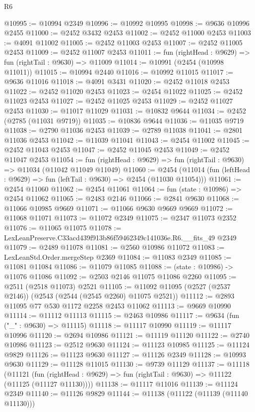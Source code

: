 \begin{lexlean}{R6}
\begin{coremodule}
@10995 := @10994 @2349
@10996 := @10992 @10995
@10998 := @9636 @10996 @2455
@11000 := @2452 @3432 @2453
@11002 := @2452 @11000 @2453
@11003 := @4091 @11002
@11005 := @2452 @11003 @2453
@11007 := @2452 @11005 @2453
@11009 := @2452 @11007 @2453
@11011 := fun (rightHead : @9629) => fun (rightTail : @9630) => @11009
@11014 := @10991 (@2454 (@10998 @11011))
@11015 := @10994 @2440
@11016 := @10992 @11015
@11017 := @9636 @11016
@11018 := @4091 @3431
@11020 := @2452 @11018 @2453
@11022 := @2452 @11020 @2453
@11023 := @2454 @11022
@11025 := @2452 @11023 @2453
@11027 := @2452 @11025 @2453
@11029 := @2452 @11027 @2453
@11030 := @11017 @11029
@11031 := @10832 @9644
@11034 := @2452 (@2785 (@11031 @9719))
@11035 := @10836 @9644
@11036 := @11035 @9719
@11038 := @2790 @11036 @2453
@11039 := @2789 @11038
@11041 := @2801 @11036 @2453
@11042 := @11039 @11041
@11043 := @2454 @11002
@11045 := @2452 @11043 @2453
@11047 := @2452 @11045 @2453
@11049 := @2452 @11047 @2453
@11054 := fun (rightHead : @9629) => fun (rightTail : @9630) => @11034 (@11042 @11049 @11049)
@11060 := @2454 (@11014 (fun (leftHead : @9629) => fun (leftTail : @9630) => @2454 (@11030 @11054)))
@11061 := @2454 @11060
@11062 := @2454 @11061
@11064 := fun (state : @10986) => @2454 @11062
@11065 := @2483 @2146
@11066 := @2841 @9630
@11068 := @11066 @10985 @9669
@11071 := @11066 @9630 @9669 @9669
@11072 := @11068 @11071
@11073 := @11072 @2349
@11075 := @2347 @11073 @2352
@11076 := @11065 @11075
@11078 := LexLeanPreserve.C33acd439f913b86f59462349c141036e.R6.__fits_49 @2349
@11079 := @2489 @11078
@11081 := @2560 @10986 @11072
@11083 := LexLeanStd.Order.mergeStep @2369
@11084 := @11083 @2349
@11085 := @11081 @11084
@11086 := @11079 @11085
@11088 := (state : @10986) -> @11076 @11086
@11092 := @2503 @2146 @11075 @11086 @2260
@11095 := @2511 (@2518 @11073) @2521
@11105 := @11092 @11095 (@2527 (@2537 @2146)) (@2543 (@2544 (@2545 @2260) @11075 @2521))
@11112 := @2893 @11095 @77 @530 @1172 @2258 @2453 @11062
@11113 := @9669 @10990
@11114 := @11112 @11113
@11115 := @2463 @10986
@11117 := @9634 (fun ("_" : @9630) => @11115)
@11118 := @11117 @10990
@11119 := @11117 @10996
@11120 := @2694 @10986
@11121 := @11119 @11120
@11122 := @2740 @10986
@11123 := @2512 @9630
@11124 := @11123 @10985
@11125 := @11124 @9829
@11126 := @11123 @9630
@11127 := @11126 @2349
@11128 := @10993 @9630
@11129 := @11128 @11015
@11130 := @9739 @11129
@11137 := @11118
    (@11121 (fun (rightHead : @9629) => fun (rightTail : @9630) => @11122 (@11125 (@11127 @11130))))
@11138 := @11117 @11016
@11139 := @11124 @2349
@11140 := @11126 @9829
@11144 := @11138 (@11122 (@11139 (@11140 @11130)))

\end{coremodule}
\end{lexlean}
